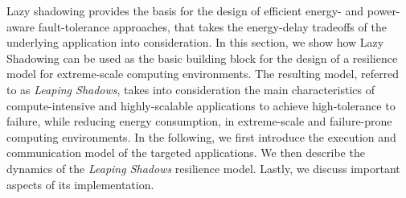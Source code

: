 




%



Lazy shadowing provides the basis for the design of efficient energy- and power-aware fault-tolerance approaches, that takes the energy-delay tradeoffs of the underlying application into consideration. In this section, we show how Lazy Shadowing can be used as the basic building block for the design of a resilience model for extreme-scale computing environments. The resulting model, referred to as {\it Leaping Shadows}, takes into consideration the main characteristics of compute-intensive and highly-scalable applications to achieve high-tolerance to failure, while reducing energy consumption, in extreme-scale and failure-prone computing environments. In the following, we first introduce the execution and communication model of the targeted applications. We then describe the dynamics of the {\it Leaping Shadows} resilience model. Lastly, we discuss important aspects of its implementation. 

